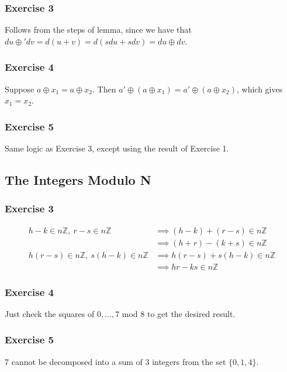 \subsubsection{Exercise 3}
Follows from the steps of lemma, since we have that $du \oplus' dv = d(u + v) = d(sdu + sdv) = du \oplus dv$.

\subsubsection{Exercise 4}
Suppose $a \oplus x_1 = a \oplus x_2$. Then $a' \oplus (a \oplus x_1) = a' \oplus (a \oplus x_2)$,
which gives $x_1 = x_2$.

\subsubsection{Exercise 5}
Same logic as Exercise 3, except using the result of Exercise 1.

\subsection{The Integers Modulo N} 

\subsubsection{Exercise 3}
\begin{align*}
        h - k \in n\mathbb{Z},\:  r - s \in n\mathbb{Z} &\implies (h - k) + (r - s) \in n\mathbb{Z} \\
                                                     &\implies (h + r) - (k + s) \in n\mathbb{Z} \\
        h (r - s) \in n\mathbb{Z},\: s (h - k) \in n\mathbb{Z} &\implies h (r - s) + s (h - k) \in n\mathbb{Z} \\
                                                               &\implies hr - ks \in n\mathbb{Z}
\end{align*}

\subsubsection{Exercise 4}
Just check the squares of $0, ..., 7$ mod 8 to get the desired result.

\subsubsection{Exercise 5}
7 cannot be decomposed into a sum of 3 integers from the set $\{0, 1, 4\}$.

